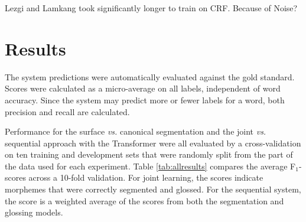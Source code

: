 Lezgi and Lamkang took significantly longer to train on CRF. Because of Noise?

\section{Results}
\label{sec:results}

The system predictions were automatically evaluated against the gold standard. Scores were calculated as a micro-average on all labels, independent of word accuracy. Since the system may predict more or fewer labels for a word, both precision and recall are calculated. 

Performance for the surface \textit{vs.} canonical segmentation and the joint \textit{vs.} sequential approach with the Transformer were all evaluated by a cross-validation on ten training and development sets that were randomly split from the part of the data used for each experiment. Table \ref{tab:allresults} compares the average F$_1$-scores across a 10-fold validation. 
For joint learning, the scores indicate morphemes that were correctly segmented and glossed. For the sequential system, the score is a weighted average of the scores from both the segmentation and glossing models. 

